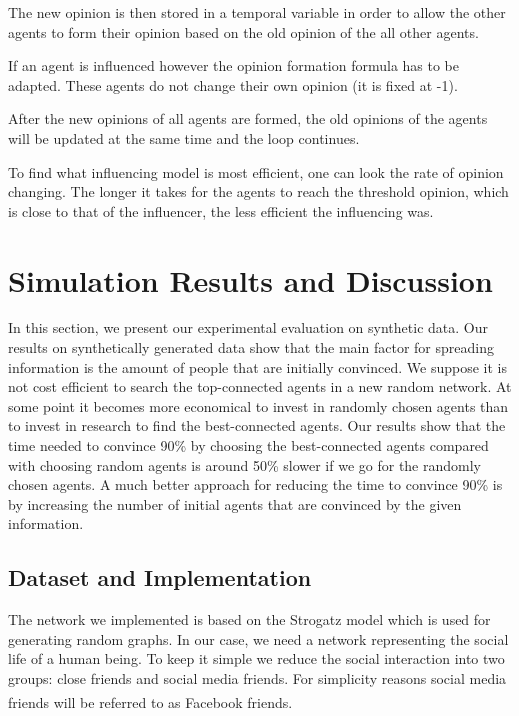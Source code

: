 \documentclass[11pt]{article}
\begin{document}
The new opinion is then stored in a temporal variable in order to allow the other agents to form their opinion based on the old opinion of the all other agents.

If an agent is influenced however the opinion formation formula has to be adapted. These agents do not change their own opinion (it is fixed at -1).

After the new opinions of all agents are formed, the old opinions of the agents will be updated at the same time and the loop continues.


To find what influencing model is most efficient, one can look the rate of opinion changing. The longer it takes for the agents to reach the threshold opinion, which is close to that of the influencer, the less efficient the influencing was.


\section{Simulation Results and Discussion}

In this section, we present our experimental evaluation on synthetic data. Our results on synthetically generated data show that the main factor for spreading information is the amount of people that are initially convinced. We suppose it is not cost efficient to search the top-connected agents in a new random network. At some point it becomes more economical to invest in randomly chosen agents than to invest in research to find the best-connected agents. Our results show that the time needed to convince 90\% by choosing the best-connected agents compared with choosing random agents is around 50\% slower if we go for the randomly chosen agents. A much better approach for reducing the time to convince 90\% is by increasing the number of initial agents that are convinced by the given information.

\subsection{Dataset and Implementation}

The network we implemented is based on the Strogatz model which is used for generating random graphs. In our case, we need a network representing the social life of a human being. To keep it simple we reduce the social interaction into two groups: close friends and social media friends. For simplicity reasons social media friends will be referred to as Facebook\textsuperscript{\textregistered} friends.
\end{document}
